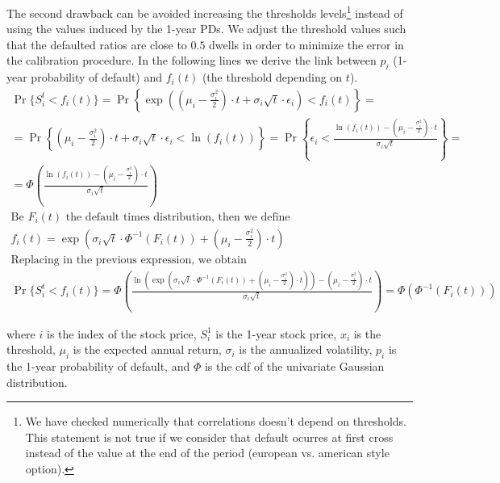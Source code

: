 \documentclass[11pt,fleqn]{book} %
\begin{document}
The second drawback can be avoided increasing the thresholds levels\footnote{ 
We have checked numerically that correlations doesn't depend on thresholds. 
This statement is not true if we consider that default ocurres at first cross 
instead of the value at the end of the period (european vs. american style 
option).} instead of using the values induced by the 1-year PDs. We 
adjust the threshold values such that the defaulted ratios are close to $0.5$ 
dwells in order to minimize the error in the calibration procedure. In the 
following lines we derive the link between $p_i$ (1-year probability of default) 
and $f_i(t)$ (the threshold depending on $t$).
\begin{displaymath}
	\begin{array}{l}
		\Pr\{S_i^t < f_i(t)\} = 
		\Pr\left\{\exp\left(\left(\mu_i-\frac{\sigma_i^2}{2}\right)\cdot t + \sigma_i\sqrt{t}\cdot\epsilon_i\right) < f_i(t)\right\} =
		\\
		=\Pr\left\{\left(\mu_i-\frac{\sigma_i^2}{2}\right)\cdot t + \sigma_i\sqrt{t}\cdot\epsilon_i < \ln(f_i(t))\right\} =
		\Pr\left\{\epsilon_i < \frac{\ln(f_i(t))-\left(\mu_i-\frac{\sigma_i^2}{2}\right)\cdot t}{\sigma_i\sqrt{t}}\right\} = 
		\\
		=\Phi\left(\frac{\ln(f_i(t))-\left(\mu_i-\frac{\sigma_i^2}{2}\right)\cdot t}{\sigma_i\sqrt{t}}\right)
		\\
		\text{Be $F_i(t)$ the default times distribution, then we define}
		\\
		f_i(t) = \exp\left(\sigma_i\sqrt{t}\cdot\Phi^{-1}(F_i(t)) + \left(\mu_i-\frac{\sigma_i^2}{2}\right)\cdot t\right)
		\\
		\text{Replacing in the previous expression, we obtain}
		\\
		\Pr\{S_i^t < f_i(t)\} = 
		\Phi\left(\frac{\ln\left(\exp\left(\sigma_i\sqrt{t}\cdot\Phi^{-1}(F_i(t)) + \left(\mu_i-\frac{\sigma_i^2}{2}\right)\cdot t\right)\right)-\left(\mu_i-\frac{\sigma_i^2}{2}\right)\cdot t}{\sigma_i\sqrt{t}}\right) =
		\Phi\left(\Phi^{-1}(F_i(t))\right)
	\end{array}
\end{displaymath}


where $i$ is the index of the stock price, $S_i^1$ is the 1-year stock price, 
$x_i$ is the threshold, $\mu_i$ is the expected annual return, $\sigma_i$ is 
the annualized volatility, $p_i$ is the 1-year probability of default, and 
$\Phi$ is the cdf of the univariate Gaussian distribution.
\end{document}
